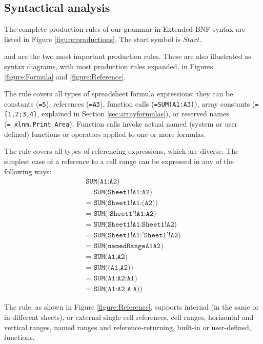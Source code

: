 \documentclass[conference]{IEEEtran}
\begin{document}
\subsection{Syntactical analysis}
\label{subsection:productionRules}

The complete production rules of our grammar in Extended BNF syntax are listed in Figure \ref{figure:productions}.
The start symbol is $Start$.

 and  are the two most important production rules.
These are also illustrated as syntax diagrams, with most production rules expanded, in Figures \ref{figure:Formula} and \ref{figure:Reference}.

The  rule covers all types of spreadsheet formula expressions: they can be constants (\texttt{=5}), references (\texttt{=A3}), function calls (\texttt{=SUM(A1:A3)}), array constants (\texttt{=\{1,2;3,4\}}, explained in Section \ref{sec:arrayformulas}), or reserved names (\texttt{=_xlnm.Print_Area}). Function calls invoke actual named (system or user defined) functions or operators applied to one or more formulas.

The  rule covers all types of referencing expressions, which are diverse. The simplest case of a reference to a cell range can be expressed in any of the following ways:
\begin{align*}
\texttt{SUM(A1:A2)} \\ 
\texttt{= SUM(Sheet1!A1:A2)} \\
\texttt{= SUM(Sheet1!A1:(A2))} \\
\texttt{= SUM('Sheet1'!A1:A2)} \\
\texttt{= SUM(Sheet1!A1:Sheet1!A2)} \\
\texttt{= SUM(Sheet1!A1:'Sheet1'!A2)} \\
\texttt{= SUM(namedRangeA1A2)} \\ 
\texttt{= SUM(A1,A2)} \\ 
\texttt{= SUM((A1,A2))} \\ 
\texttt{= SUM(A1:A2:A1)} \\
\texttt{= SUM(A1:A2 A:A))} 
\end{align*}

The  rule, as shown in Figure \ref{figure:Reference}, supports internal (in the same or in different sheets), or external single cell references, cell ranges, horizontal and vertical ranges, named ranges and reference-returning, built-in or user-defined, functions.
\end{document}
